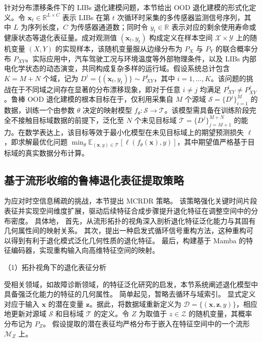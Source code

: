 针对分布漂移条件下的 LIBs 退化建模问题，本节给出 OOD 退化建模的形式化定义。令 $\boldsymbol{x}_{t} \in \mathbb{R}^{L \times C}$ 表示 LIBs 在第 $t$ 次循环时采集的多传感器监测信号序列，其中 $L$ 为序列长度，$C$ 为传感器通道数；同时令 $y_{t} \in \mathbb{R}$ 表示对应的剩余使用寿命或健康状态等退化表征量。成对观测值 $(\boldsymbol{x}_{t}, y_{t})$ 构成定义在样本空间 $\mathcal{X} \times \mathcal{Y}$ 上的随机变量 $(X, Y)$ 的实现样本，该随机变量服从边缘分布为 $P_{X}$ 与 $P_{Y}$ 的联合概率分布 $P_{XY}$。实际应用中，汽车驾驶工况与环境温度等外部物理条件，以及 LIBs 内部电化学状态的动态演变，共同构成复杂多样的运行域。假设系统总计包含 $K = M + N$ 个域，记为 $D^{i} = \{ (\boldsymbol{x}_{t}, y_{t}) \} \sim P^{i}_{XY}$，其中 $i=1,\dots,K$。该问题的挑战在于不同域之间存在显著的分布漂移现象，即对于任意 $i \neq j$ 均满足 $P^{i}_{XY} \neq P^{j}_{XY}$。鲁棒 OOD 退化建模的根本目标在于，仅利用采集自 $M$ 个源域 $\mathcal{S} = \{ D^{i} \}_{i=1}^{M}$ 的数据，训练一个由参数 $\theta$ 决定的映射模型 $f_{\theta}: \mathcal{S} \to \mathcal{T}$。该模型需具备在训练阶段完全不接触目标域数据的前提下，泛化至 $N$ 个未见目标域 $\mathcal{T} = \{ D^{j} \}_{j=M+1}^{M+N}$ 的能力。在数学表达上，该目标等效于最小化模型在未见目标域上的期望预测损失 $\ell$，即求解最优化问题 $\mathop{\min}_{\theta}\mathbb{E}_{(\boldsymbol{x}, y) \in \mathcal{T}} [\ell(f_{\theta}(\boldsymbol{x}), y)]$，其中期望值严格基于目标域的真实数据分布计算。

\subsection{基于流形收缩的鲁棒退化表征提取策略}

为应对时空信息稀疏的挑战，本节提出 MCRDR 策略。
该策略强化关键时间片段表征并实现空间维度扩展，驱动后续特征合成步骤提升退化特征在调整空间中的分布密度。
% 
具体地，
首先，从流形拓扑的视角深入剖析退化特征泛化能力与其固有几何属性间的映射关系。
其次，提出一种启发式循环信号重构方法，这种重构可以得到有利于退化模式泛化几何性质的退化特征。
最后，构建基于 Mamba 的特征编码器，实现重构输入向高维特征空间的映射。

（1）拓扑视角下的退化表征分析

受相关领域，如故障诊断领域，的特征泛化研究的启发，本节系统阐述退化模型中具备强泛化能力的特征的几何属性。
简单起见，暂略去循环与域索引。
显式定义对应于输入 $\boldsymbol{x}$ 的潜在变量 $\boldsymbol{z}$。据此，将数据域重新定义为 $\mathcal{D} = \{( \boldsymbol{x}, \boldsymbol{z}, y)\}$，相应地更新对源域 $\mathcal{S}$ 和目标域 $\mathcal{T}$ 的定义。令 $Z$ 为取值于 $z \in \mathcal{Z}$ 的随机变量，其概率分布记为 $P_Z$。
假设提取的潜在表征均严格分布于嵌入在特征空间中的一个流形 $\mathcal{M}_Z$ 上。

